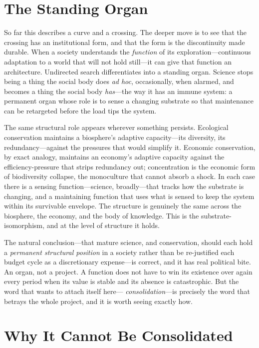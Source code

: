 \documentclass{article}
\begin{document}
\section*{The Standing Organ}

So far this describes a curve and a crossing. The deeper move is to see that the crossing has an institutional form, and that the form is the discontinuity made durable. When a society understands the \textit{function} of its exploration---continuous adaptation to a world that will not hold still---it can give that function an architecture. Undirected search differentiates into a standing organ. Science stops being a thing the social body does \textit{ad hoc}, occasionally, when alarmed, and becomes a thing the social body \textit{has}---the way it has an immune system: a permanent organ whose role is to sense a changing substrate so that maintenance can be retargeted before the load tips the system.

The same structural role appears wherever something persists. Ecological conservation maintains a biosphere's adaptive capacity---its diversity, its redundancy---against the pressures that would simplify it. Economic conservation, by exact analogy, maintains an economy's adaptive capacity against the efficiency-pressure that strips redundancy out; concentration is the economic form of biodiversity collapse, the monoculture that cannot absorb a shock. In each case there is a sensing function---science, broadly---that tracks how the substrate is changing, and a maintaining function that uses what is sensed to keep the system within its survivable envelope. The structure is genuinely the same across the biosphere, the economy, and the body of knowledge. This is the substrate-isomorphism, and at the level of structure it holds.

The natural conclusion---that mature science, and conservation, should each hold a \textit{permanent structural position} in a society rather than be re-justified each budget cycle as a discretionary expense---is correct, and it has real political bite. An organ, not a project. A function does not have to win its existence over again every period when its value is stable and its absence is catastrophic. But the word that wants to attach itself here--- \textit{consolidation}---is precisely the word that betrays the whole project, and it is worth seeing exactly how.

\section*{Why It Cannot Be Consolidated}
\end{document}
